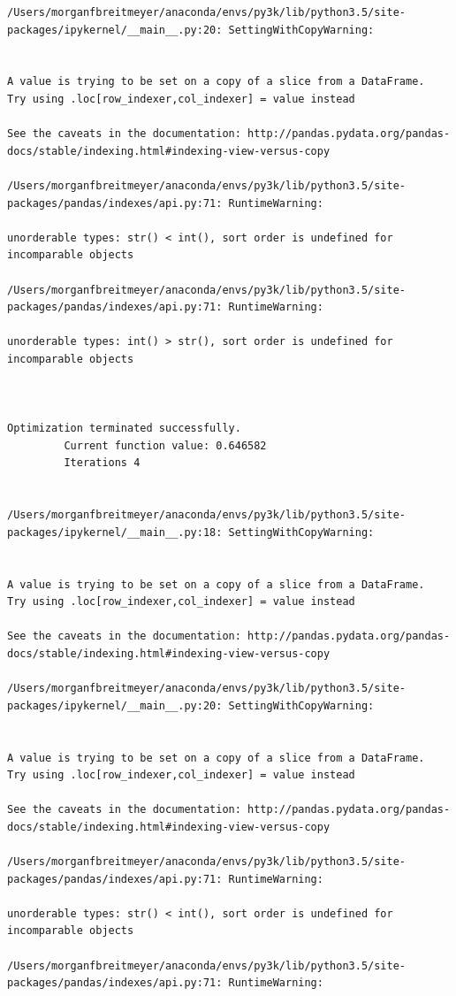 \begin{lstlisting}
/Users/morganfbreitmeyer/anaconda/envs/py3k/lib/python3.5/site-packages/ipykernel/__main__.py:20: SettingWithCopyWarning:


A value is trying to be set on a copy of a slice from a DataFrame.
Try using .loc[row_indexer,col_indexer] = value instead

See the caveats in the documentation: http://pandas.pydata.org/pandas-docs/stable/indexing.html#indexing-view-versus-copy

/Users/morganfbreitmeyer/anaconda/envs/py3k/lib/python3.5/site-packages/pandas/indexes/api.py:71: RuntimeWarning:

unorderable types: str() < int(), sort order is undefined for incomparable objects

/Users/morganfbreitmeyer/anaconda/envs/py3k/lib/python3.5/site-packages/pandas/indexes/api.py:71: RuntimeWarning:

unorderable types: int() > str(), sort order is undefined for incomparable objects



Optimization terminated successfully.
         Current function value: 0.646582
         Iterations 4


/Users/morganfbreitmeyer/anaconda/envs/py3k/lib/python3.5/site-packages/ipykernel/__main__.py:18: SettingWithCopyWarning:


A value is trying to be set on a copy of a slice from a DataFrame.
Try using .loc[row_indexer,col_indexer] = value instead

See the caveats in the documentation: http://pandas.pydata.org/pandas-docs/stable/indexing.html#indexing-view-versus-copy

/Users/morganfbreitmeyer/anaconda/envs/py3k/lib/python3.5/site-packages/ipykernel/__main__.py:20: SettingWithCopyWarning:


A value is trying to be set on a copy of a slice from a DataFrame.
Try using .loc[row_indexer,col_indexer] = value instead

See the caveats in the documentation: http://pandas.pydata.org/pandas-docs/stable/indexing.html#indexing-view-versus-copy

/Users/morganfbreitmeyer/anaconda/envs/py3k/lib/python3.5/site-packages/pandas/indexes/api.py:71: RuntimeWarning:

unorderable types: str() < int(), sort order is undefined for incomparable objects

/Users/morganfbreitmeyer/anaconda/envs/py3k/lib/python3.5/site-packages/pandas/indexes/api.py:71: RuntimeWarning:


\end{lstlisting}
